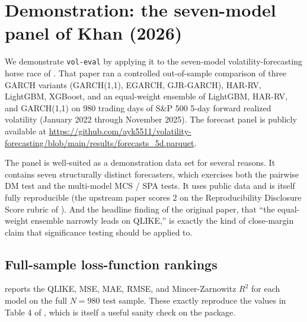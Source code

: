 \section{Demonstration: the seven-model panel of Khan (2026)}\label{sec:demonstration}

\sloppy

We demonstrate \texttt{vol-eval} by applying it to the seven-model volatility-forecasting horse race of \citet{KhanVol2026}. That paper ran a controlled out-of-sample comparison of three GARCH variants (GARCH(1,1), EGARCH, GJR-GARCH), HAR-RV, LightGBM, XGBoost, and an equal-weight ensemble of LightGBM, HAR-RV, and GARCH(1,1) on 980 trading days of S\&P 500 5-day forward realized volatility (January 2022 through November 2025). The forecast panel is publicly available at \url{https://github.com/ayk5511/volatility-forecasting/blob/main/results/forecasts_5d.parquet}.

The panel is well-suited as a demonstration data set for several reasons. It contains seven structurally distinct forecasters, which exercises both the pairwise DM test and the multi-model MCS / SPA tests. It uses public data and is itself fully reproducible (the upstream paper scores 2 on the Reproducibility Disclosure Score rubric of \citet{Khan2026Survey}). And the headline finding of the original paper, that ``the equal-weight ensemble narrowly leads on QLIKE,'' is exactly the kind of close-margin claim that significance testing should be applied to.

\subsection{Full-sample loss-function rankings}

 reports the QLIKE, MSE, MAE, RMSE, and Mincer-Zarnowitz $R^2$ for each model on the full $N=980$ test sample. These exactly reproduce the values in Table 4 of \citet{KhanVol2026}, which is itself a useful sanity check on the package.

